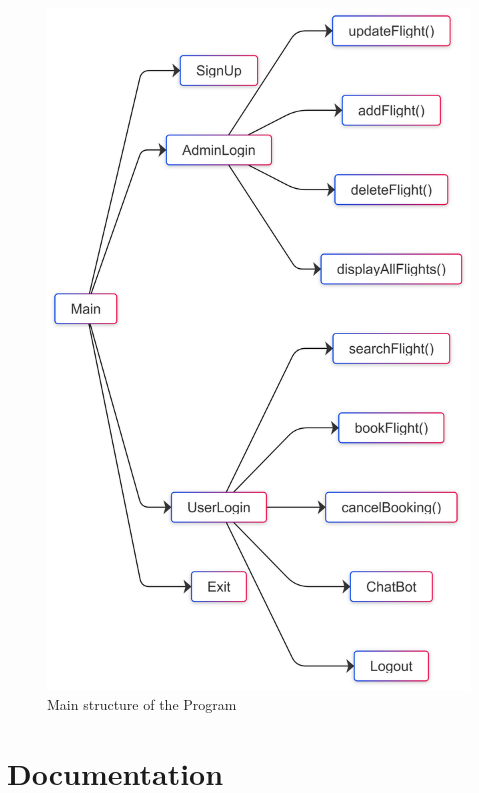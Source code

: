 \documentclass[a4paper]{scrartcl}
\begin{document}
\begin{figure}[H]
    \centering
    \includegraphics[scale=0.1]{main structure.png}
    \caption{Main structure of the Program}
\end{figure}


\section{Documentation}
\end{document}
